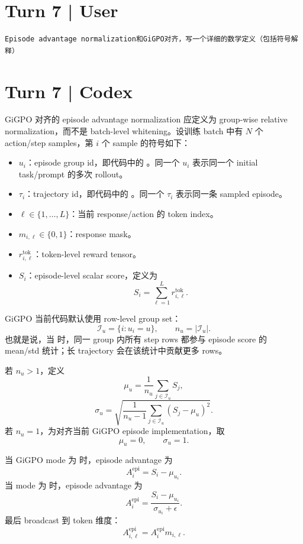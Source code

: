 \documentclass[10pt]{ctexart}
\begin{document}
\section*{Turn 7 | User}
\begin{Verbatim}[breaklines=true,breakanywhere=true]
Episode advantage normalization和GiGPO对齐，写一个详细的数学定义（包括符号解释）
\end{Verbatim}

\section*{Turn 7 | Codex}
GiGPO 对齐的 episode advantage normalization 应定义为 group-wise relative normalization，而不是 batch-level whitening。设训练 batch 中有 $N$ 个 action/step samples，第 $i$ 个 sample 的符号如下：
\begin{itemize}
\item $u_i$：episode group id，即代码中的 。同一个 $u_i$ 表示同一个 initial task/prompt 的多次 rollout。
\item $\tau_i$：trajectory id，即代码中的 。同一个 $\tau_i$ 表示同一条 sampled episode。
\item $\ell\in\{1,\ldots,L\}$：当前 response/action 的 token index。
\item $m_{i,\ell}\in\{0,1\}$：response mask。
\item $r^{\mathrm{tok}}_{i,\ell}$：token-level reward tensor。
\item $S_i$：episode-level scalar score，定义为
\[
S_i=\sum_{\ell=1}^{L}r^{\mathrm{tok}}_{i,\ell}.
\]
\end{itemize}

GiGPO 当前代码默认使用 row-level group set：
\[
\mathcal I_u=\{i:u_i=u\},
\qquad
n_u=|\mathcal I_u|.
\]
也就是说，当  时，同一 group 内所有 step rows 都参与 episode score 的 mean/std 统计；长 trajectory 会在该统计中贡献更多 rows。

若 $n_u>1$，定义
\[
\mu_u=\frac{1}{n_u}\sum_{j\in\mathcal I_u}S_j,
\]
\[
\sigma_u=\sqrt{\frac{1}{n_u-1}\sum_{j\in\mathcal I_u}(S_j-\mu_u)^2}.
\]
若 $n_u=1$，为对齐当前 GiGPO episode implementation，取
\[
\mu_u=0,
\qquad
\sigma_u=1.
\]

当 GiGPO mode 为  时，episode advantage 为
\[
A_i^{\mathrm{epi}}=S_i-\mu_{u_i}.
\]
当 mode 为  时，episode advantage 为
\[
A_i^{\mathrm{epi}}=\frac{S_i-
\mu_{u_i}}{\sigma_{u_i}+\epsilon}.
\]
最后 broadcast 到 token 维度：
\[
A_{i,\ell}^{\mathrm{epi}}=A_i^{\mathrm{epi}}m_{i,\ell}.
\]
\end{document}
